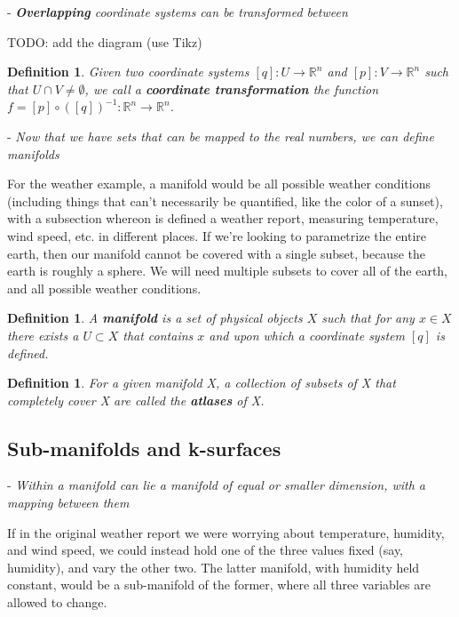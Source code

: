 \documentclass{book}
\newtheorem{defn}[equation]{Definition}
\begin{document}
- \emph{\textbf{Overlapping} coordinate systems can be transformed between}

TODO: add the diagram (use Tikz)

\begin{defn}
	Given two coordinate systems  $[q] : U \to \mathbb{R}^n$ and $[p] : V \to \mathbb{R}^n$ such that $U \cap V \neq \emptyset$, we call a \textbf{coordinate transformation} the function $f = [p] \circ ([q])^{-1} : \mathbb{R}^n \to \mathbb{R}^n$.
\end{defn}




- \emph{Now that we have sets that can be mapped to the real numbers, we can define manifolds}

For the weather example, a manifold would be all possible weather conditions (including things that can't necessarily be quantified, like the color of a sunset), with a subsection whereon is defined a weather report, measuring temperature, wind speed, etc. in different places. If we're looking to parametrize the entire earth, then our manifold cannot be covered with a single subset, because the earth is roughly a sphere. We will need multiple subsets to cover all of the earth, and all possible weather conditions. 


 
\begin{defn}
	A \textbf{manifold} is a set of physical objects $X$ such that for any $x \in X$ there exists a $U \subset X$ that contains $x$ and upon which a coordinate system $[q]$ is defined.
\end{defn}

\begin{defn}
	For a given manifold X, a collection of subsets of X that completely cover X are called the \textbf{atlases} of X. 
\end{defn}



\subsection{Sub-manifolds and k-surfaces}

- \emph{Within a manifold can lie a manifold of equal or smaller dimension, with a mapping between them}

If in the original weather report we were worrying about temperature, humidity, and wind speed, we could instead hold one of the three values fixed (say, humidity), and vary the other two. The latter manifold, with humidity held constant, would be a sub-manifold of the former, where all three variables are allowed to change.  
\end{document}
